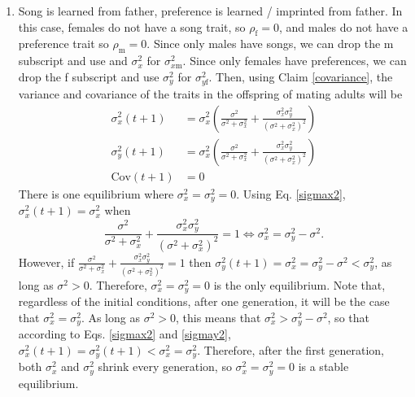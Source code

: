 \documentclass{article}
\newcommand{\x}[1]{\text{#1}}
\newcommand{\Cov}{\text{Cov}}
\begin{document}
\begin{enumerate}
\item Song is learned from father, preference is learned / imprinted from father.  In this case, females do not have a song trait, so $\rho_\x{f}=0$, and males do not have a preference trait so $\rho_\x{m}=0$. Since only males have songs, we can drop the m subscript and use and $\sigma_x^2$ for $\sigma_{x\x{m}}^2$. Since only females have preferences, we can drop the f subscript and use $\sigma_y^2$ for $\sigma_{y\x{f}}^2$. Then, using Claim \ref{covariance}, the variance and covariance of the traits in the offspring of mating adults will be 
\begin{align}
\sigma_x^2(t+1)&=\sigma_x^2\left(\frac{\sigma^2}{\sigma^2+\sigma_x^2}+\frac{\sigma_x^2\sigma_y^2}{(\sigma^2+\sigma_x^2)^2}\right) \label{sigmax2}
\\ \sigma_y^2(t+1)&=\sigma_x^2\left(\frac{\sigma^2}{\sigma^2+\sigma_x^2}+\frac{\sigma_x^2\sigma_y^2}{(\sigma^2+\sigma_x^2)^2}\right) \label{sigmay2}
\\ \Cov(t+1)&=0
\end{align}
There is one equilibrium where $\sigma_x^2=\sigma_y^2=0$. Using Eq. \ref{sigmax2}, 
$\sigma_x^2(t+1)=\sigma_x^2$ when $$ \frac{\sigma^2}{\sigma^2+\sigma_x^2}+\frac{\sigma_x^2\sigma_y^2}{(\sigma^2+\sigma_x^2)^2}=1 \Leftrightarrow \sigma_x^2=\sigma_y^2-\sigma^2.$$ However, if $\frac{\sigma^2}{\sigma^2+\sigma_x^2}+\frac{\sigma_x^2\sigma_y^2}{(\sigma^2+\sigma_x^2)^2}=1$ then $\sigma_y^2(t+1)=\sigma_x^2=\sigma_y^2-\sigma^2<\sigma_y^2$, as long as $\sigma^2>0$. Therefore, $\sigma_x^2=\sigma_y^2=0$ is the only equilibrium. Note that, regardless of the initial conditions, after one generation, it will be the case that $\sigma_x^2=\sigma_y^2$. As long as $\sigma^2>0$, this means that $\sigma_x^2>\sigma_y^2-\sigma^2$, so that according to Eqs. \ref{sigmax2} and \ref{sigmay2}, $\sigma_x^2(t+1)=\sigma_y^2(t+1)<\sigma_x^2=\sigma_y^2$. Therefore, after the first generation, both $\sigma_x^2$ and $\sigma_y^2$ shrink every generation, so $\sigma_x^2=\sigma_y^2=0$ is a stable equilibrium.

\end{enumerate}
\end{document}

